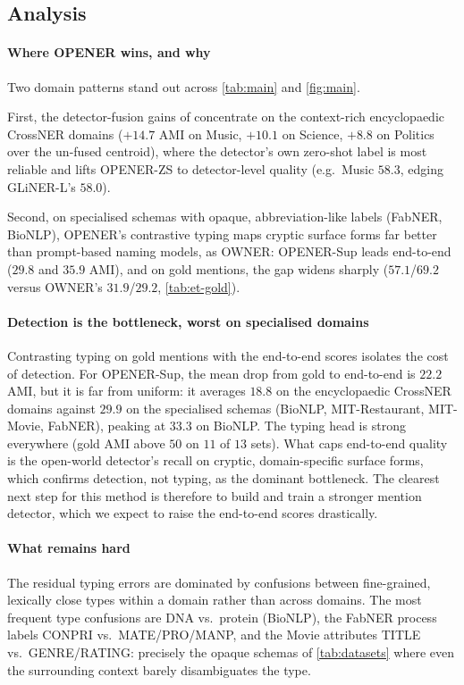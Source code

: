 \subsection{Analysis}
\label{sec:exp:analysis}

\paragraph{Where OPENER wins, and why}
Two domain patterns stand out across \autoref{tab:main} and \autoref{fig:main}.

First, the detector-fusion gains of \zstr concentrate on the context-rich encyclopaedic CrossNER domains ($+14.7$ AMI on Music, $+10.1$ on Science, $+8.8$ on Politics over the un-fused centroid), where the detector's own zero-shot label is most reliable and lifts OPENER-ZS to detector-level quality (e.g.\ Music $58.3$, edging GLiNER-L's $58.0$).

Second, on specialised schemas with opaque, abbreviation-like labels (FabNER, BioNLP), OPENER's contrastive typing maps cryptic surface forms far better than prompt-based naming models, as OWNER: OPENER-Sup leads end-to-end ($29.8$ and $35.9$ AMI), and on gold mentions, the gap widens sharply ($57.1$/$69.2$ versus OWNER's $31.9$/$29.2$, \autoref{tab:et-gold}).

\paragraph{Detection is the bottleneck, worst on specialised domains}
Contrasting typing on gold mentions with the end-to-end scores isolates the cost of detection.
For OPENER-Sup, the mean drop from gold to end-to-end is $22.2$ AMI, but it is far from uniform: it averages $18.8$ on the encyclopaedic CrossNER domains against $29.9$ on the specialised schemas (BioNLP, MIT-Restaurant, MIT-Movie, FabNER), peaking at $33.3$ on BioNLP.
The typing head is strong everywhere (gold AMI above $50$ on $11$ of $13$ sets). What caps end-to-end quality is the open-world detector's recall on cryptic, domain-specific surface forms, which confirms detection, not typing, as the dominant bottleneck. The clearest next step for this method is therefore to build and train a stronger mention detector, which we expect to raise the end-to-end scores drastically.

\paragraph{What remains hard}
The residual typing errors are dominated by confusions between fine-grained, lexically close types within a domain rather than across domains.
The most frequent type confusions are DNA vs.\ protein (BioNLP), the FabNER process labels CONPRI vs.\ MATE/PRO/MANP, and the Movie attributes TITLE vs.\ GENRE/RATING: precisely the opaque schemas of \autoref{tab:datasets} where even the surrounding context barely disambiguates the type.

